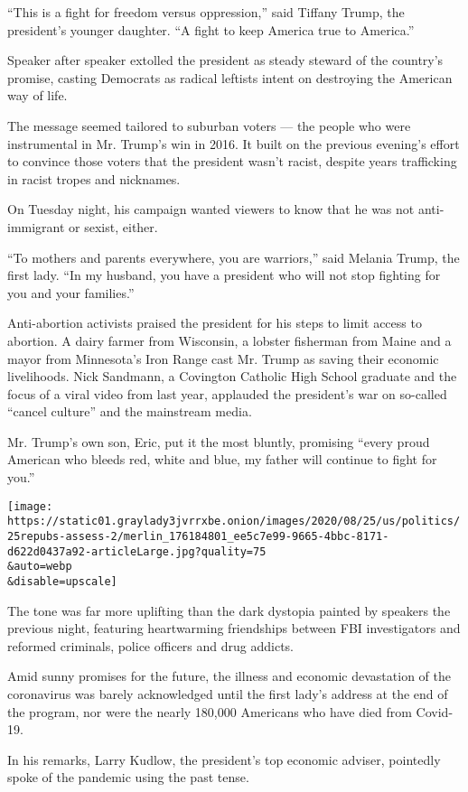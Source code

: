 ``This is a fight for freedom versus oppression,'' said Tiffany Trump,
the president's younger daughter. ``A fight to keep America true to
America.''

Speaker after speaker extolled the president as steady steward of the
country's promise, casting Democrats as radical leftists intent on
destroying the American way of life.

The message seemed tailored to suburban voters --- the people who were
instrumental in Mr. Trump's win in 2016. It built on the previous
evening's effort to convince those voters that the president wasn't
racist, despite years trafficking in racist tropes and nicknames.

On Tuesday night, his campaign wanted viewers to know that he was not
anti-immigrant or sexist, either.

``To mothers and parents everywhere, you are warriors,'' said Melania
Trump, the first lady. ``In my husband, you have a president who will
not stop fighting for you and your families.''

Anti-abortion activists praised the president for his steps to limit
access to abortion. A dairy farmer from Wisconsin, a lobster fisherman
from Maine and a mayor from Minnesota's Iron Range cast Mr. Trump as
saving their economic livelihoods. Nick Sandmann, a Covington Catholic
High School graduate and the focus of a viral video from last year,
applauded the president's war on so-called ``cancel culture'' and the
mainstream media.

Mr. Trump's own son, Eric, put it the most bluntly, promising ``every
proud American who bleeds red, white and blue, my father will continue
to fight for you.''

\texttt{[image: https://static01.graylady3jvrrxbe.onion/images/2020/08/25/us/politics/25repubs-assess-2/merlin\_176184801\_ee5c7e99-9665-4bbc-8171-d622d0437a92-articleLarge.jpg?quality=75\\\&auto=webp\\\&disable=upscale]}

The tone was far more uplifting than the dark dystopia painted by
speakers the previous night, featuring heartwarming friendships between
FBI investigators and reformed criminals, police officers and drug
addicts.

Amid sunny promises for the future, the illness and economic devastation
of the coronavirus was barely acknowledged until the first lady's
address at the end of the program, nor were the nearly 180,000 Americans
who have died from Covid-19.

In his remarks, Larry Kudlow, the president's top economic adviser,
pointedly spoke of the pandemic using the past tense.

